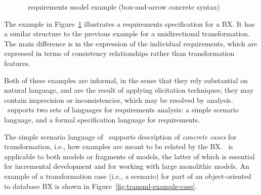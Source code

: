 \begin{figure}[htbp]
\caption{\transml\ requirements model example (box-and-arrow concrete syntax)}
\label{fig:transml-requirements-example2}
\end{figure}

The example in Figure~\ref{fig:transml-requirements-example2} illustrates a requirements specification for a BX. It has a similar structure to the previous example for a unidirectional transformation. The main difference is in the expression of the individual requirements, which are expressed in terms of consistency relationships rather than transformation features. 

Both of these examples are informal, in the sense that they rely substantial on natural language, and are the result of applying elicitation techniques; they may contain imprecision or inconsistencies, which may be resolved by analysis. \transml\ supports two sets of languages for requirements analysis: a simple scenario language, and a formal specification language for requirements. 

The simple scenario language of \transml\ supports description of \textit{concrete cases} for transformation, i.e., how examples are meant to be related by the BX. \transml\ is applicable to both models or fragments of models, the latter of which is essential for incremental development and for working with large monolithic models. An example of a transformation case (i.e., a scenario) for part of an object-oriented to database BX is shown in Figure~\ref{fig:transml-example-case}.

